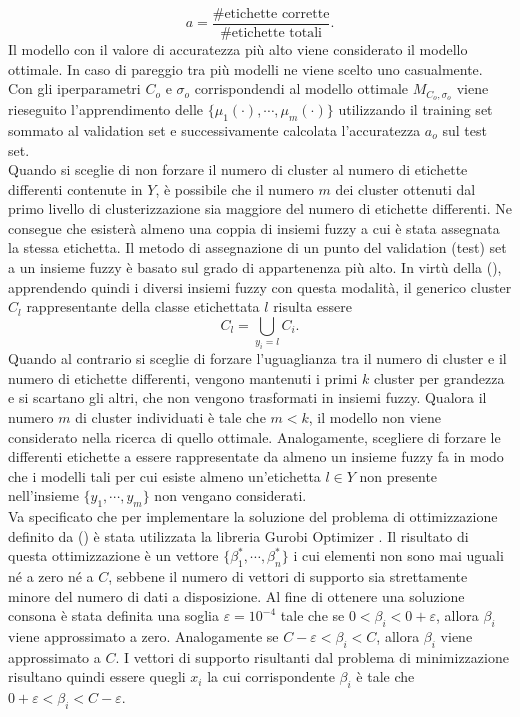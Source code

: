 \documentclass [11pt,a4paper,twoside,openright] {book}
\begin{document}
\begin{equation}
a = \dfrac{\text{\# etichette corrette}}{\text{\# etichette totali}}.
\end{equation}Il modello con il valore di accuratezza più alto viene considerato il modello ottimale. In caso di pareggio tra più modelli ne viene scelto uno casualmente.
Con gli iperparametri $C_o$ e $\sigma_o$ corrispondendi al modello ottimale $M_{C_o, \sigma_o}$ viene rieseguito l'apprendimento delle $\lbrace \mu_1(\cdot), \cdots, \mu_m(\cdot) \rbrace$ utilizzando il training set sommato al validation set e successivamente calcolata l'accuratezza $a_o$ sul test set.\\
Quando si sceglie di non forzare il numero di cluster al numero di etichette differenti contenute in $Y$, è possibile che il numero $m$ dei cluster ottenuti dal primo livello di clusterizzazione sia maggiore del numero di etichette differenti. Ne consegue che esisterà almeno una coppia di insiemi fuzzy a cui è stata assegnata la stessa etichetta. Il metodo di assegnazione di un punto del validation (test) set a un insieme fuzzy è basato sul grado di appartenenza più alto. In virtù della (), apprendendo quindi i diversi insiemi fuzzy con questa modalità, il generico cluster $C_l$ rappresentante della classe etichettata $l$ risulta essere
\begin{equation}
C_l = \bigcup_{y_i = l} C_i.
\end{equation}
Quando al contrario si sceglie di forzare l'uguaglianza tra il numero di cluster e il numero di etichette differenti, vengono mantenuti i primi $k$ cluster per grandezza e si scartano gli altri, che non vengono trasformati in insiemi fuzzy. Qualora il numero $m$ di cluster individuati è tale che $m<k$, il modello non viene considerato nella ricerca di quello ottimale. Analogamente, scegliere di forzare le differenti etichette a essere rappresentate da almeno un insieme fuzzy fa in modo che i modelli tali per cui esiste almeno un'etichetta $l \in Y$ non presente nell'insieme $\lbrace y_1, \cdots, y_m \rbrace$ non vengano considerati.\\
Va specificato che per implementare la soluzione del problema di ottimizzazione definito da () è stata utilizzata la libreria Gurobi Optimizer \cite{optimization2014inc}. Il risultato di questa ottimizzazione è un vettore $\lbrace \beta_1^*, \cdots, \beta_n^* \rbrace$ i cui elementi non sono mai uguali né a zero né a $C$, sebbene il numero di vettori di supporto sia strettamente minore del numero di dati a disposizione. Al fine di ottenere una soluzione consona è stata definita una soglia $\varepsilon = 10^{-4}$ tale che se $0 < \beta_i < 0 + \varepsilon$, allora $\beta_i$ viene approssimato a zero. Analogamente se $C - \varepsilon < \beta_i < C$, allora $\beta_i$ viene approssimato a $C$. I vettori di supporto risultanti dal problema di minimizzazione risultano quindi essere quegli $x_i$ la cui corrispondente $\beta_i$ è tale  che $0 + \varepsilon < \beta_i < C -\varepsilon$.
\end{document}
